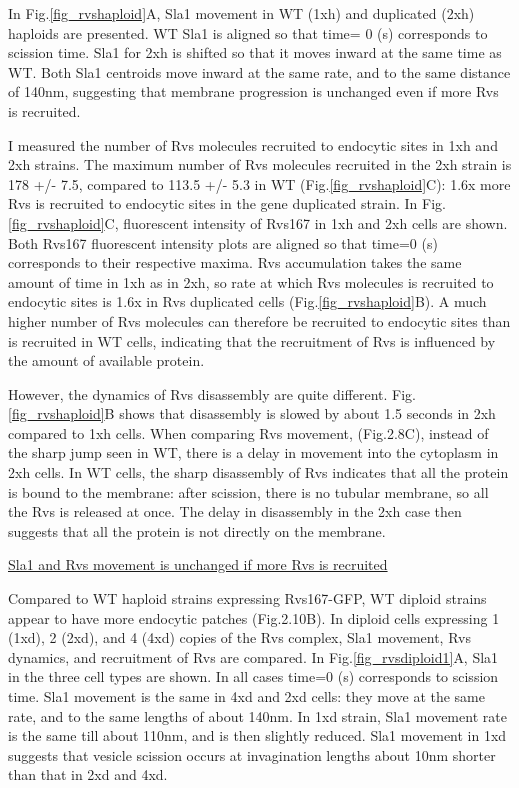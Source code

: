 In Fig.\ref{fig_rvshaploid}A, Sla1 movement in WT (1xh) and duplicated (2xh) haploids are presented. WT Sla1 is aligned so that time= 0 (s) corresponds to scission time. Sla1 for 2xh is shifted so that it moves inward at the same time as WT. Both Sla1 centroids move inward at the same rate, and to the same distance of 140nm, suggesting that membrane progression is unchanged even if more Rvs is recruited. 

I measured the number of Rvs molecules recruited to endocytic sites in 1xh and 2xh strains. The maximum number of Rvs molecules recruited in the 2xh strain is 178 +/- 7.5, compared to 113.5 +/- 5.3 in WT (Fig.\ref{fig_rvshaploid}C): 1.6x more Rvs is recruited to endocytic sites in the gene duplicated strain. In Fig.\ref{fig_rvshaploid}C, fluorescent intensity of Rvs167 in 1xh and 2xh cells are shown. Both Rvs167 fluorescent intensity plots are aligned so that time=0 (s) corresponds to their respective maxima. Rvs accumulation takes the same amount of time in 1xh as in 2xh, so rate at which Rvs molecules is recruited to endocytic sites is 1.6x in Rvs duplicated cells (Fig.\ref{fig_rvshaploid}B). A much higher number of Rvs molecules can therefore be recruited to endocytic sites than is recruited in  WT cells, indicating that the recruitment of Rvs is influenced by the amount of available protein.

However, the dynamics of Rvs disassembly are quite different. Fig.\ref{fig_rvshaploid}B shows that disassembly is slowed by about 1.5 seconds in 2xh compared to 1xh cells. When comparing Rvs movement, (Fig.2.8C), instead of the sharp jump seen in WT, there is a delay in movement into the cytoplasm in 2xh cells. In WT cells, the sharp disassembly of Rvs indicates that all the protein is bound to the membrane: after scission, there is no tubular membrane, so all the Rvs is released at once. The delay in disassembly in the 2xh case then suggests that all the protein is not directly on the membrane. 
	\vspace{5mm}

		

		
\underline{Sla1 and Rvs movement is unchanged if more Rvs is recruited}
		\label{sub_rvsdiploids}
		
Compared to WT haploid strains expressing Rvs167-GFP, WT diploid strains appear to have more endocytic patches (Fig.2.10B). 
In diploid cells expressing 1 (1xd), 2 (2xd), and 4 (4xd) copies of the Rvs complex, Sla1 movement, Rvs dynamics, and recruitment of Rvs are compared. 
In Fig.\ref{fig_rvsdiploid1}A, Sla1 in the three cell types are shown. In all cases time=0 (s) corresponds to scission time. Sla1 movement is the same in 4xd and 2xd cells: they move at the same rate, and to the same lengths of about 140nm. In 1xd strain, Sla1 movement rate is the same till about 110nm, and is then slightly reduced. Sla1 movement in 1xd suggests that vesicle scission occurs at invagination lengths about 10nm shorter than that in 2xd and 4xd. 

